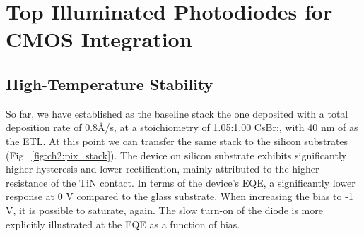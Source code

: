 \section{Top Illuminated Photodiodes for CMOS Integration}

\subsection{High-Temperature Stability}

So far, we have established as the baseline stack the one deposited with a total deposition rate of 0.8{\AA}/s, at a stoichiometry of 1.05:1.00 CsBr:, with 40 nm of  as the ETL. At this point we can transfer the same stack to the silicon substrates (Fig.~\ref{fig:ch2:pix_stack}). 
The device on silicon substrate exhibits significantly higher hysteresis and lower rectification, mainly attributed to the higher resistance of the TiN contact. In terms of the device's EQE, a significantly lower response at 0 V compared to the glass substrate. When increasing the bias to -1 V, it is possible to saturate, again. The slow turn-on of the diode is more explicitly illustrated at the EQE as a function of bias. 



